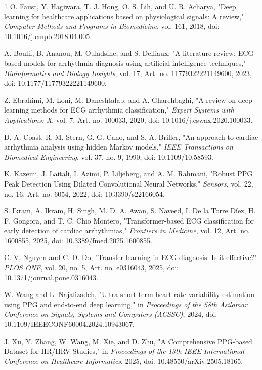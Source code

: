 \documentclass{citask}
\begin{document}
\begin{thebibliography}{1}
O. Faust, Y. Hagiwara, T. J. Hong, O. S. Lih, and U. R. Acharya, "Deep learning for healthcare applications based on physiological signals: A review," \emph{Computer Methods and Programs in Biomedicine}, vol. 161, 2018, doi: 10.1016/j.cmpb.2018.04.005.

A. Boulif, B. Ananou, M. Ouladsine, and S. Delliaux, "A literature review: ECG-based models for arrhythmia diagnosis using artificial intelligence techniques," \emph{Bioinformatics and Biology Insights}, vol. 17, Art. no. 11779322221149600, 2023, doi: 10.1177/11779322221149600.

Z. Ebrahimi, M. Loni, M. Daneshtalab, and A. Gharehbaghi, "A review on deep learning methods for ECG arrhythmia classification," \emph{Expert Systems with Applications: X}, vol. 7, Art. no. 100033, 2020, doi: 10.1016/j.eswax.2020.100033.

D. A. Coast, R. M. Stern, G. G. Cano, and S. A. Briller, "An approach to cardiac arrhythmia analysis using hidden Markov models," \emph{IEEE Transactions on Biomedical Engineering}, vol. 37, no. 9, 1990, doi: 10.1109/10.58593.

K. Kazemi, J. Laitali, I. Azimi, P. Liljeberg, and A. M. Rahmani, "Robust PPG Peak Detection Using Dilated Convolutional Neural Networks," \emph{Sensors}, vol. 22, no. 16, Art. no. 6054, 2022, doi: 10.3390/s22166054.

S. Ikram, A. Ikram, H. Singh, M. D. A. Awan, S. Naveed, I. De la Torre Díez, H. F. Gongora, and T. C. Chio Montero, "Transformer-based ECG classification for early detection of cardiac arrhythmias," \emph{Frontiers in Medicine}, vol. 12, Art. no. 1600855, 2025, doi: 10.3389/fmed.2025.1600855.

C. V. Nguyen and C. D. Do, "Transfer learning in ECG diagnosis: Is it effective?" \emph{PLOS ONE}, vol. 20, no. 5, Art. no. e0316043, 2025, doi: 10.1371/journal.pone.0316043.

W. Wang and L. Najafizadeh, "Ultra-short term heart rate variability estimation using PPG and end-to-end deep learning," in \emph{Proceedings of the 58th Asilomar Conference on Signals, Systems and Computers (ACSSC)}, 2024, doi: 10.1109/IEEECONF60004.2024.10943067.

J. Xu, Y. Zhang, W. Wang, M. Xie, and D. Zhu, "A Comprehensive PPG-based Dataset for HR/HRV Studies," in \emph{Proceedings of the 13th IEEE International Conference on Healthcare Informatics}, 2025, doi: 10.48550/arXiv.2505.18165.


\end{thebibliography}
\end{document}
